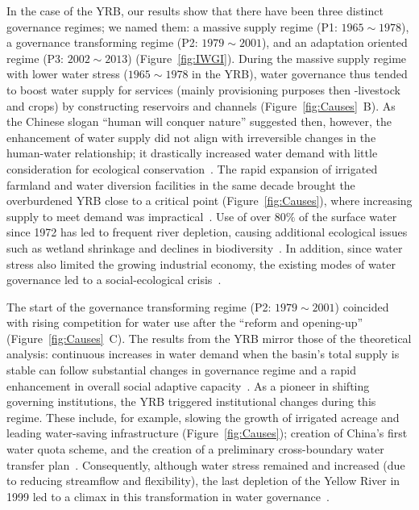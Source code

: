 \documentclass[draft]{../agujournal2019}
\begin{document}
In the case of the YRB, our results show that there have been three distinct governance regimes; we named them: a massive supply regime (P1: $1965 \sim 1978$), a governance transforming regime (P2: $1979 \sim 2001$), and an adaptation oriented regime (P3: $2002 \sim 2013$) (Figure~\ref{fig:IWGI}).
During the massive supply regime with lower water stress ($1965 \sim 1978$ in the YRB), water governance thus tended to boost water supply for services (mainly provisioning purposes then -livestock and crops) by constructing reservoirs and channels (Figure~\ref{fig:Causes}~B).
As the Chinese slogan ``human will conquer nature'' suggested then, however, the enhancement of water supply did not align with irreversible changes in the human-water relationship; it drastically increased water demand with little consideration for ecological conservation~\cite{zhou2020}.
The rapid expansion of irrigated farmland and water diversion facilities in the same decade brought the overburdened YRB close to a critical point (Figure~\ref{fig:Causes}), where increasing supply to meet demand was impractical~\cite{loch2020}.
Use of over $80\%$ of the surface water since 1972 has led to frequent river depletion, causing additional ecological issues such as wetland shrinkage and declines in biodiversity~\cite{wang2019c}.
In addition, since water stress also limited the growing industrial economy, the existing modes of water governance led to a social-ecological crisis~\cite{wohlfart2016}.

The start of the governance transforming regime (P2: $1979 \sim 2001$) coincided with rising competition for water use after the ``reform and opening-up'' (Figure~\ref{fig:Causes}~C).
The results from the YRB mirror those of the theoretical analysis: continuous increases in water demand when the basin's total supply is stable can follow substantial changes in governance regime and a rapid enhancement in overall social adaptive capacity~\cite{loch2020}.
As a pioneer in shifting governing institutions, the YRB triggered institutional changes during this regime. These include, for example, slowing the growth of irrigated acreage and leading water-saving infrastructure (Figure~\ref{fig:Causes}); creation of China's first water quota scheme, and the creation of a preliminary cross-boundary water transfer plan~\cite{wang2019e,long2020,nickum2021}.
Consequently, although water stress remained and increased (due to reducing streamflow and flexibility), the last depletion of the Yellow River in 1999 led to a climax in this transformation in water governance~\cite{wang2019e}.
\end{document}
